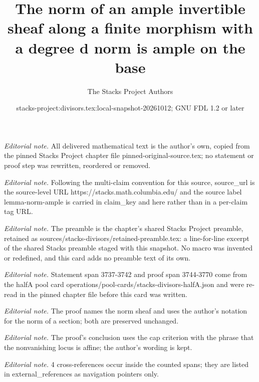 \documentclass[10pt,a4paper]{amsart}
\title{The norm of an ample invertible sheaf along a finite morphism with a degree d norm is ample on the base}
\author{The Stacks Project Authors}
\date{stacks-project:divisors.tex:local-snapshot-20261012; GNU FDL 1.2 or later}
\theoremstyle{plain}
\theoremstyle{definition}
\theoremstyle{remark}
\numberwithin{equation}{subsection}
\begin{document}
\maketitle
\noindent\textit{Editorial note.} All delivered mathematical text is the author's own, copied from the pinned Stacks Project chapter file pinned-original-source.tex; no statement or proof step was rewritten, reordered or removed.\par\medskip
\noindent\textit{Editorial note.} Following the multi-claim convention for this source, source\_url is the source-level URL https://stacks.math.columbia.edu/ and the source label lemma-norm-ample is carried in claim\_key and here rather than in a per-claim tag URL.\par\medskip
\noindent\textit{Editorial note.} The preamble is the chapter's shared Stacks Project preamble, retained as sources/stacks-divisors/retained-preamble.tex: a line-for-line excerpt of the shared Stacks preamble staged with this snapshot. No macro was invented or redefined, and this card adds no preamble text of its own.\par\medskip
\noindent\textit{Editorial note.} Statement span 3737-3742 and proof span 3744-3770 come from the halfA pool card operations/pool-cards/stacks-divisors-halfA.json and were re-read in the pinned chapter file before this card was written.\par\medskip
\noindent\textit{Editorial note.} The proof names the norm sheaf and uses the author's notation for the norm of a section; both are preserved unchanged.\par\medskip
\noindent\textit{Editorial note.} The proof's conclusion uses the cap criterion with the phrase that the nonvanishing locus is affine; the author's wording is kept.\par\medskip
\noindent\textit{Editorial note.} 4 cross-references occur inside the counted spans; they are listed in external\_references as navigation pointers only.\par\medskip
\end{document}
